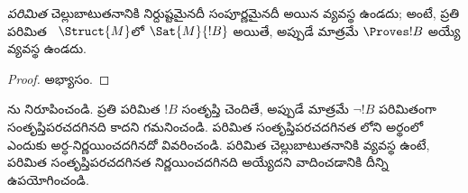 \documentclass[../../../include/open-logic-section]{subfiles}
\begin{document}
\begin{cor}%
  \emph{పరిమిత} చెల్లుబాటుతనానికి నిర్దుష్టమైనదీ సంపూర్ణమైనదీ అయిన
   వ్యవస్థ ఉండదు; అంటే, ప్రతి పరిమిత ~$\Struct{M}$లో
  $\Sat{M}{!B}$ అయితే, అప్పుడే మాత్రమే $\Proves !B$ అయ్యే
   వ్యవస్థ ఉండదు.
\end{cor}

\begin{proof}
  అభ్యాసం.
\end{proof}

\begin{prob}
  ను నిరూపించండి. ప్రతి పరిమిత
   $!B$ సంతృప్తి చెందితే, అప్పుడే మాత్రమే $\lnot !B$
  పరిమితంగా సంతృప్తిపరచదగినది కాదని గమనించండి. పరిమిత
  సంతృప్తిపరచదగినత లోని అర్థంలో ఎందుకు
  అర్ధ-నిర్ణయించదగినదో వివరించండి. పరిమిత చెల్లుబాటుతనానికి
   వ్యవస్థ ఉంటే, పరిమిత సంతృప్తిపరచదగినత నిర్ణయించదగినది
  అయ్యేదని వాదించడానికి దీన్ని ఉపయోగించండి.
\end{prob}
\end{document}
